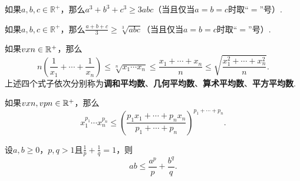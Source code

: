 \begin{theorem}\label{theorem:不等式.基本不等式3}
如果\(a,b,c\in\mathbb{R}^+\)，那么\(a^3 + b^3 + c^3 \geqslant 3abc\)（当且仅当\(a=b=c\)时取“\(=\)”号）.
\end{theorem}

\begin{corollary}\label{theorem:不等式.基本不等式4}
如果\(a,b,c\in\mathbb{R}^+\)，那么\(\frac{a+b+c}{3} \geqslant \sqrt[3]{abc}\)（当且仅当\(a=b=c\)时取“\(=\)”号）.
\end{corollary}

\begin{theorem}[均值不等式]\label{theorem:不等式.均值不等式}
如果\(v{x}{n}\in\mathbb{R}^+\)，那么
\begin{equation}
n \left( \frac{1}{x_1} + \dotsb + \frac{1}{x_n} \right)
\leqslant \sqrt[n]{x_1 \dotsm x_n}
\leqslant \frac{x_1 + \dotsb + x_n}{n}
\leqslant \sqrt{\frac{x_1^2 + \dotsb + x_n^2}{n}}.
\end{equation}
\rm
上述四个式子依次分别称为\textbf{调和平均数}、\textbf{几何平均数}、\textbf{算术平均数}、\textbf{平方平均数}.
\end{theorem}

\begin{corollary}\label{theorem:不等式.基本不等式6}
如果\(v{x}{n},v{p}{n}\in\mathbb{R}^+\)，那么
\begin{equation}
x_1^{p_1} \dotsm x_n^{p_n}
\leqslant
\left( \frac{p_1 x_1 + \dotsb + p_n x_n}{p_1 + \dotsb + p_n} \right)^{p_1 + \dotsb + p_n}.
\end{equation}
\end{corollary}

\begin{corollary}[杨格不等式]\label{theorem:不等式.杨格不等式}
设\(a,b\geqslant0\)，\(p,q>1\)且\(\frac{1}{p}+\frac{1}{q}=1\)，则
\begin{equation}
ab \leqslant \frac{a^p}{p} + \frac{b^q}{q}.
\end{equation}
\end{corollary}

